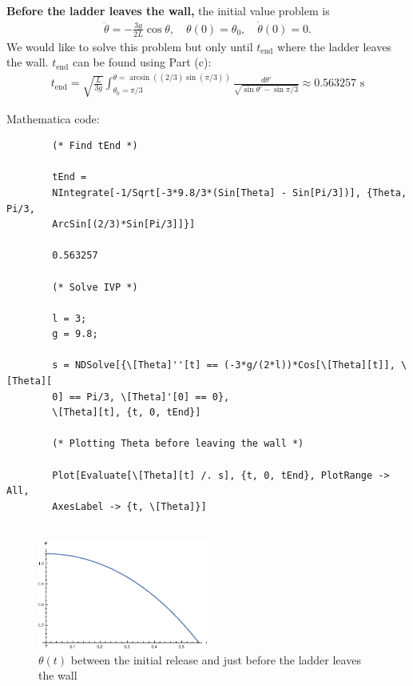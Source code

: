 \documentclass{article}
\theoremstyle{definition}
\newcommand{\f}[2]{\frac{#1}{#2}}
\begin{document}
\begin{enumerate}[label = (\alph*)]
		
		\textbf{Before the ladder leaves the wall,} the initial value problem is 
		\begin{align*}
		\ddot\theta  = -\f{3g}{2L}\cos\theta, \quad \theta(0) = \theta_0, \quad \dot\theta(0) = 0.
		\end{align*}
		We would like to solve this problem but only until $t_\text{end}$ where the ladder leaves the wall. $t_\text{end}$ can be found  using Part (c):
		\begin{align*}
		t_\text{end} = \sqrt{\f{L}{3g}} \int_{\theta_0=\pi/3}^{\theta = \arcsin((2/3)\sin(\pi/3))} \f{d\theta'}{\sqrt{\sin\theta' - \sin\pi/3}} \approx 0.563257 \text{ s}
		\end{align*}
		
		Mathematica code:
		\begin{lstlisting}
		(* Find tEnd *)
		
		tEnd = 
		NIntegrate[-1/Sqrt[-3*9.8/3*(Sin[Theta] - Sin[Pi/3])], {Theta, Pi/3, 
		ArcSin[(2/3)*Sin[Pi/3]]}]
		
		0.563257
		
		(* Solve IVP *)
		
		l = 3;
		g = 9.8;
		
		s = NDSolve[{\[Theta]''[t] == (-3*g/(2*l))*Cos[\[Theta][t]], \[Theta][
		0] == Pi/3, \[Theta]'[0] == 0},
		\[Theta][t], {t, 0, tEnd}]
		
		(* Plotting Theta before leaving the wall *)
		
		Plot[Evaluate[\[Theta][t] /. s], {t, 0, tEnd}, PlotRange -> All, 
		AxesLabel -> {t, \[Theta]}]
		
		\end{lstlisting}
		
		\begin{figure}[!htb]
			\centering
			\includegraphics[width=0.5\textwidth]{theta_contact.eps}
			\caption{$\theta(t)$ between the initial release and just before the ladder leaves the wall}
		\end{figure}
	

\end{enumerate}
\end{document}
